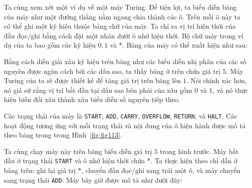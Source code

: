 Ta cùng xem xét một ví dụ về một máy Turing. Để tiện lợi, ta biểu diễn băng của máy như
một đường thẳng nằm ngang chia thành các ô. Trên mỗi ô này ta có thể ghi một ký hiệu thuộc
bảng chữ của máy. Ta chỉ ra vị trí hiện thời của đầu đọc/ghi bằng cách đặt một nhãn dưới ô
nhớ hiện thời. Bộ chữ máy trong ví dụ của ta bao gồm các ký hiệu $0,1$ và $*$. Băng của
máy có thể xuất hiện như sau:
\begin{center}
\end{center}

Bằng cách diễn giải xâu ký hiệu trên băng như các biểu diễn nhị phân của các số nguyên
được ngăn cách bởi các dấu sao, ta thấy băng ở trên chứa giá trị $5$. Máy Turing của ta sẽ
được thiết kế để tăng giá trị trên băng lên $1$. Nói chính xác hơn, nó giả sử rằng vị trí
bắt đầu tại dấu sao bên phải của xâu gồm $0$ và $1$, và nó thực hiện biến đổi xâu thành
xâu biểu diễn số nguyên tiếp theo.

Các trạng thái của máy là \texttt{START}, \texttt{ADD}, \texttt{CARRY}, \texttt{OVERFLOW},
\texttt{RETURN}, và \texttt{HALT}. Các hoạt động tương ứng với mỗi trạng thái và nội dung
của ô hiện hành được mô tả theo bảng trong trong Hình~\ref{fig:fig113}.
 
Ta cùng chạy máy này trên băng biểu diễn giá trị $5$ trong hình trước. Máy bắt đầu ở trạng
thái \texttt{START} và ô nhớ hiện thời chứa $*$. Ta thực hiện theo chỉ dẫn ở bảng trên:
ghi lại giá trị $*$, chuyển đầu đọc/ghi sang trái một ô, và máy chuyển sang trạng thái
\texttt{ADD}. Máy bây giờ được mô tả như dưới đây:
\begin{center}
\end{center}


